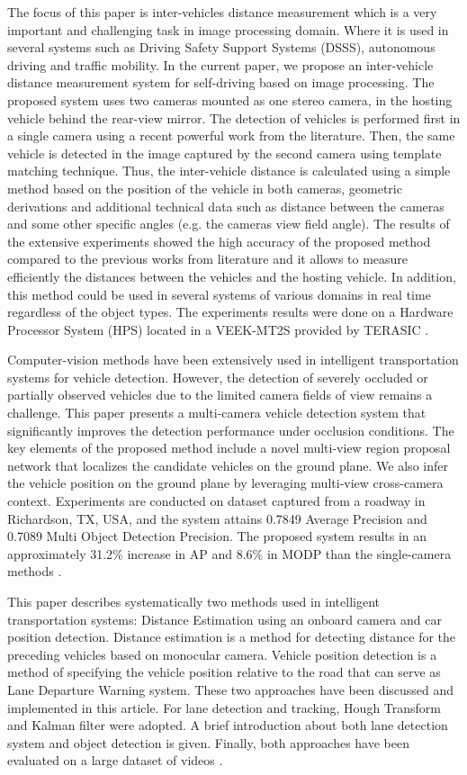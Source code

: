 The focus of this paper is inter-vehicles distance measurement which is a very important and challenging task in image processing domain. Where it is used in several systems such as Driving Safety Support Systems (DSSS), autonomous driving and traffic mobility. In the current paper, we propose an inter-vehicle distance measurement system for self-driving based on image processing. The proposed system uses two cameras mounted as one stereo camera, in the hosting vehicle behind the rear-view mirror. The detection of vehicles is performed first in a single camera using a recent powerful work from the literature. Then, the same vehicle is detected in the image captured by the second camera using template matching technique. Thus, the inter-vehicle distance is calculated using a simple method based on the position of the vehicle in both cameras, geometric derivations and additional technical data such as distance between the cameras and some other specific angles (e.g. the cameras view field angle). The results of the extensive experiments showed the high accuracy of the proposed method compared to the previous works from literature and it allows to measure efficiently the distances between the vehicles and the hosting vehicle. In addition, this method could be used in several systems of various domains in real time regardless of the object types. The experiments results were done on a Hardware Processor System (HPS) located in a VEEK-MT2S provided by TERASIC \cite{Zaarane2020}.

Computer-vision methods have been extensively used in intelligent transportation systems for vehicle detection. However, the detection of severely occluded or partially observed vehicles due to the limited camera fields of view remains a challenge. This paper presents a multi-camera vehicle detection system that significantly improves the detection performance under occlusion conditions. The key elements of the proposed method include a novel multi-view region proposal network that localizes the candidate vehicles on the ground plane. We also infer the vehicle position on the ground plane by leveraging multi-view cross-camera context. Experiments are conducted on dataset captured from a roadway in Richardson, TX, USA, and the system attains 0.7849 Average Precision and 0.7089 Multi Object Detection Precision. The proposed system results in an approximately 31.2\% increase in AP and 8.6\% in MODP than the single-camera methods \cite{Wu2019}.

This paper describes systematically two methods used in intelligent transportation systems: Distance Estimation using an onboard camera and car position detection. Distance estimation is a method for detecting distance for the preceding vehicles based on monocular camera. Vehicle position detection is a method of specifying the vehicle position relative to the road that can serve as Lane Departure Warning system. These two approaches have been discussed and implemented in this article. For lane detection and tracking, Hough Transform and Kalman filter were adopted. A brief introduction about both lane detection system and object detection is given. Finally, both approaches have been evaluated on a large dataset of videos \cite{Ali2016}.

